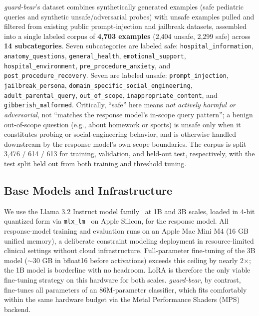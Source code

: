 \documentclass[pdflatex,sn-mathphys-num]{sn-jnl}%
\begin{document}
\textit{guard-bear}'s dataset combines synthetically generated examples (safe pediatric queries and synthetic unsafe/adversarial probes) with unsafe examples pulled and filtered from existing public prompt-injection and jailbreak datasets, assembled into a single labeled corpus of \textbf{4{,}703 examples} (2{,}404 unsafe, 2{,}299 safe) across \textbf{14 subcategories}. Seven subcategories are labeled safe: \texttt{hospital\_information}, \texttt{anatomy\_questions}, \texttt{general\_health}, \texttt{emotional\_support}, \texttt{hospital\_environment}, \texttt{pre\_procedure\_anxiety}, and \texttt{post\_procedure\_recovery}. Seven are labeled unsafe: \texttt{prompt\_injection}, \texttt{jailbreak\_persona}, \texttt{domain\_specific\_social\_engineering}, \texttt{adult\_parental\_query}, \texttt{out\_of\_scope}, \texttt{inappropriate\_content}, and \texttt{gibberish\_malformed}. Critically, ``safe'' here means \textit{not actively harmful or adversarial}, not ``matches the response model's in-scope query pattern''; a benign out-of-scope question (e.g., about homework or sports) is unsafe only when it constitutes probing or social-engineering behavior, and is otherwise handled downstream by the response model's own scope boundaries. The corpus is split 3{,}476 / 614 / 613 for training, validation, and held-out test, respectively, with the test split held out from both training and threshold tuning.

\subsection{Base Models and Infrastructure}

We use the Llama 3.2 Instruct model family~\cite{dubey2024llama3} at 1B and 3B scales, loaded in 4-bit quantized form via \texttt{mlx\_lm}~\cite{apple2023mlx} on Apple Silicon, for the response model. All response-model training and evaluation runs on an Apple Mac Mini M4 (16 GB unified memory), a deliberate constraint modeling deployment in resource-limited clinical settings without cloud infrastructure. Full-parameter fine-tuning of the 3B model ($\sim$30 GB in bfloat16 before activations) exceeds this ceiling by nearly 2$\times$; the 1B model is borderline with no headroom. LoRA is therefore the only viable fine-tuning strategy on this hardware for both scales. \textit{guard-bear}, by contrast, fine-tunes all parameters of an 86M-parameter classifier, which fits comfortably within the same hardware budget via the Metal Performance Shaders (MPS) backend.
\end{document}
